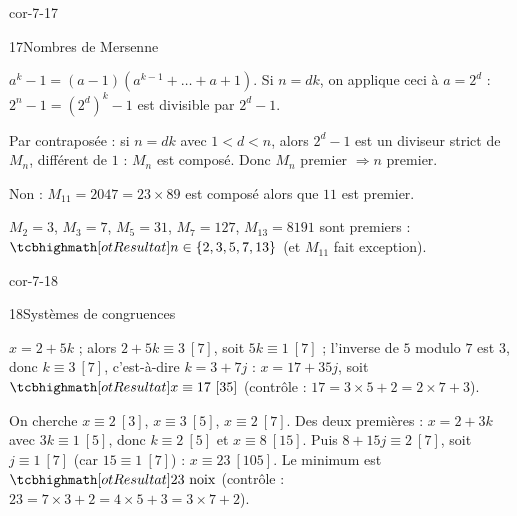\begin{blocLivre}{cor-7-17}
\begin{corrige}{17}{Nombres de Mersenne}
\begin{questions}
  \item $a^{k}-1=(a-1)(a^{k-1}+\dots+a+1)$. Si $n=dk$, on applique ceci à
    $a=2^{d}$ : $2^{n}-1=(2^{d})^{k}-1$ est divisible par $2^{d}-1$.
  \item Par contraposée : si $n=dk$ avec $1<d<n$, alors $2^{d}-1$ est un
    diviseur strict de $M_n$, différent de $1$ : $M_n$ est composé. Donc
    $M_n$ premier $\Rightarrow n$ premier.
  \item Non : $M_{11}=2047=23\times89$ est composé alors que $11$ est
    premier.
  \item $M_2=3$, $M_3=7$, $M_5=31$, $M_7=127$, $M_{13}=8191$ sont
    premiers : $\res{n\in\ens{2,3,5,7,13}}$ (et $M_{11}$ fait exception).
\end{questions}
\end{corrige}
\end{blocLivre}

\begin{blocLivre}{cor-7-18}
\begin{corrige}{18}{Systèmes de congruences}
\begin{questions}
  \item $x=2+5k$ ; alors $2+5k\equiv3\ [7]$, soit $5k\equiv1\ [7]$ ;
    l'inverse de $5$ modulo $7$ est $3$, donc $k\equiv3\ [7]$, c'est-à-dire
    $k=3+7j$ : $x=17+35j$, soit $\res{x\equiv17\ [35]}$
    (contrôle : $17=3\times5+2=2\times7+3$).
  \item On cherche $x\equiv2\ [3]$, $x\equiv3\ [5]$, $x\equiv2\ [7]$.
    Des deux premières : $x=2+3k$ avec $3k\equiv1\ [5]$, donc $k\equiv2\ [5]$
    et $x\equiv8\ [15]$. Puis $8+15j\equiv2\ [7]$, soit $j\equiv1\ [7]$
    (car $15\equiv1\ [7]$) : $x\equiv23\ [105]$. Le minimum est
    $\res{23\text{ noix}}$ (contrôle : $23=7\times3+2=4\times5+3=3\times7+2$).
\end{questions}
\end{corrige}
\end{blocLivre}

